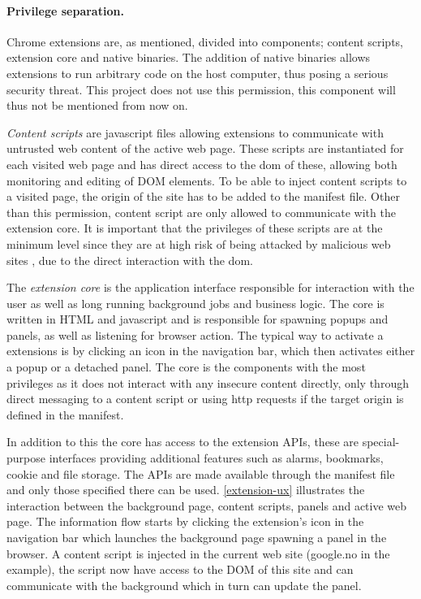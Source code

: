 \paragraph{Privilege separation.} Chrome extensions are, as mentioned, divided into components; content scripts, extension core and native binaries. The addition of native binaries allows extensions to run arbitrary code on the host computer, thus posing a serious security threat. This project does not use this permission, this component will thus not be mentioned from now on. 
\par \emph{Content scripts} are javascript files allowing extensions to communicate with untrusted web content of the active web page. These scripts are instantiated for each visited web page and has direct access to the \gls{dom} of these, allowing both monitoring and editing of DOM elements. To be able to inject content scripts to a visited page, the origin of the site has to be added to the manifest file. Other than this permission, content script are only allowed to communicate with the extension core. It is important that the privileges of these scripts are at the minimum level since they are at high risk of being attacked by malicious web sites \cite{chrome-extension-dangers}, due to the direct interaction with the \gls{dom}. 
\par The \emph{extension core} is the application interface responsible for interaction with the user as well as long running background jobs and business logic. The core is written in HTML and javascript and is responsible for spawning popups and panels, as well as listening for browser action. The typical way to activate a extensions is by clicking an icon in the navigation bar, which then activates either a popup or a detached panel. The core is the components with the most privileges as it does not interact with any insecure content directly, only through direct messaging to a content script or using http requests if the target origin is defined in the manifest. 
\par In addition to this the core has access to the extension APIs, these are special-purpose interfaces providing additional features such as alarms, bookmarks, cookie and file storage. The APIs are made available through the manifest file and only those specified there can be used. \autoref{extension-ux} illustrates the interaction between the background page, content scripts, panels and active web page. The information flow starts by clicking the extension's icon in the navigation bar which launches the background page spawning a panel in the browser. A content script is injected in the current web site (google.no in the example), the script now have access to the DOM of this site and can communicate with the background which in turn can update the panel. 


